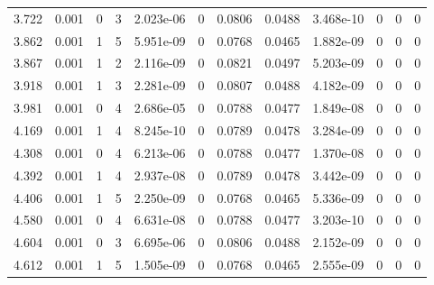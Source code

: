 \documentclass[preview]{standalone}
\begin{document}
{{\begin{tabular}{L{1.2cm}C{1.2cm} C{0.3cm}C{0.5cm} C{1.4cm}C{1.4cm} C{1.4cm}C{1.4cm} C{1.6cm}C{1.6cm} C{1.6cm}C{1.6cm}}
  3.722  &  0.001  & 0     &  3 &  2.023e-06  & 0  &  0.0806&   0.0488& 3.468e-10 & 0   &  0 & 0  \\ 
  3.862  &  0.001  & 1     &  5 &  5.951e-09  & 0  &  0.0768&   0.0465& 1.882e-09 & 0   &  0 & 0  \\ 
  3.867  &  0.001  & 1     &  2 &  2.116e-09  & 0  &  0.0821&   0.0497& 5.203e-09 & 0   &  0 & 0  \\ 
  3.918  &  0.001  & 1     &  3 &  2.281e-09  & 0  &  0.0807&   0.0488& 4.182e-09 & 0   &  0 & 0  \\ 
  3.981  &  0.001  & 0     &  4 &  2.686e-05  & 0  &  0.0788&   0.0477& 1.849e-08 & 0   &  0 & 0  \\ 
  4.169  &  0.001  & 1     &  4 &  8.245e-10  & 0  &  0.0789&   0.0478& 3.284e-09 & 0   &  0 & 0  \\ 
  4.308  &  0.001  & 0     &  4 &  6.213e-06  & 0  &  0.0788&   0.0477& 1.370e-08 & 0   &  0 & 0  \\ 
  4.392  &  0.001  & 1     &  4 &  2.937e-08  & 0  &  0.0789&   0.0478& 3.442e-09 & 0   &  0 & 0  \\ 
  4.406  &  0.001  & 1     &  5 &  2.250e-09  & 0  &  0.0768&   0.0465& 5.336e-09 & 0   &  0 & 0  \\ 
  4.580  &  0.001  & 0     &  4 &  6.631e-08  & 0  &  0.0788&   0.0477& 3.203e-10 & 0   &  0 & 0  \\ 
  4.604  &  0.001  & 0     &  3 &  6.695e-06  & 0  &  0.0806&   0.0488& 2.152e-09 & 0   &  0 & 0  \\ 
  4.612  &  0.001  & 1     &  5 &  1.505e-09  & 0  &  0.0768&   0.0465& 2.555e-09 & 0   &  0 & 0  \\ 
\hline 
\end{tabular} 

}}
\end{document}
